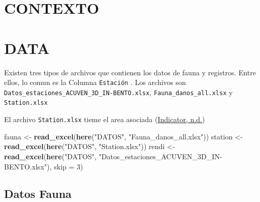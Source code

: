 \documentclass[
]{article}
\newenvironment{Shaded}{\begin{snugshade}}{\end{snugshade}}
\newcommand{\AttributeTok}[1]{\textcolor[rgb]{0.13,0.29,0.53}{#1}}
\newcommand{\DecValTok}[1]{\textcolor[rgb]{0.00,0.00,0.81}{#1}}
\newcommand{\FunctionTok}[1]{\textcolor[rgb]{0.13,0.29,0.53}{\textbf{#1}}}
\newcommand{\NormalTok}[1]{#1}
\newcommand{\OtherTok}[1]{\textcolor[rgb]{0.56,0.35,0.01}{#1}}
\newcommand{\SpecialCharTok}[1]{\textcolor[rgb]{0.81,0.36,0.00}{\textbf{#1}}}
\newcommand{\StringTok}[1]{\textcolor[rgb]{0.31,0.60,0.02}{#1}}
\begin{document}
\hypertarget{contexto}{%
\section{CONTEXTO}\label{contexto}}

\hypertarget{data}{%
\section{DATA}\label{data}}

Existen tres tipos de archivos que contienen los datos de fauna y registros. Entre ellos, lo comun es la Columna \texttt{Estación} . Los archivos son \texttt{Datos\_estaciones\_ACUVEN\_3D\_IN-BENTO.xlsx}, \texttt{Fauna\_danos\_all.xlsx} y \texttt{Station.xlsx}

El archivo \texttt{Station.xlsx} tieme el area asociada
(\protect\hyperlink{ref-Indicator}{Indicator, n.d.})

\begin{Shaded}
\begin{Highlighting}[]
\NormalTok{fauna }\OtherTok{\textless{}{-}} \FunctionTok{read\_excel}\NormalTok{(}\FunctionTok{here}\NormalTok{(}\StringTok{"DATOS"}\NormalTok{,}
                         \StringTok{"Fauna\_danos\_all.xlsx"}\NormalTok{))}
\NormalTok{station }\OtherTok{\textless{}{-}} \FunctionTok{read\_excel}\NormalTok{(}\FunctionTok{here}\NormalTok{(}\StringTok{"DATOS"}\NormalTok{,}
                         \StringTok{"Station.xlsx"}\NormalTok{))}
\NormalTok{rendi }\OtherTok{\textless{}{-}} \FunctionTok{read\_excel}\NormalTok{(}\FunctionTok{here}\NormalTok{(}\StringTok{"DATOS"}\NormalTok{,}
                         \StringTok{"Datos\_estaciones\_ACUVEN\_3D\_IN{-}BENTO.xlsx"}\NormalTok{),}
                         \AttributeTok{skip =} \DecValTok{3}\NormalTok{)}
\end{Highlighting}
\end{Shaded}

\hypertarget{datos-fauna}{%
\subsection{Datos Fauna}\label{datos-fauna}}

\begin{Shaded}
\end{Shaded}
\end{document}
